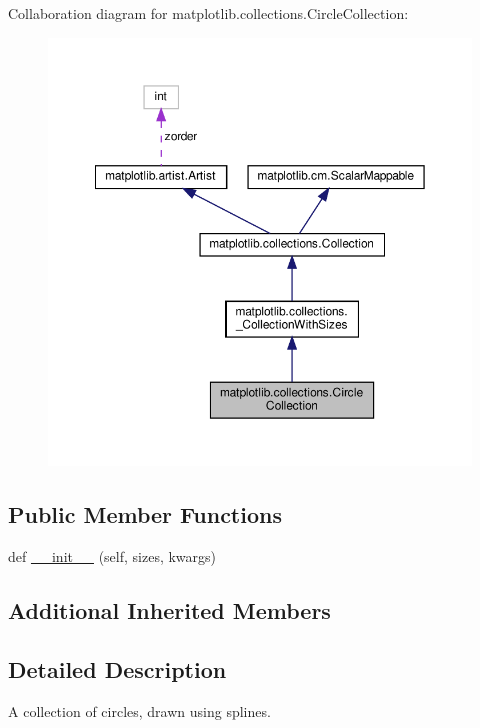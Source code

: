 Collaboration diagram for matplotlib.\+collections.\+Circle\+Collection\+:
\nopagebreak
\begin{figure}[H]
\begin{center}
\leavevmode
\includegraphics[width=350pt]{classmatplotlib_1_1collections_1_1CircleCollection__coll__graph}
\end{center}
\end{figure}
\subsection*{Public Member Functions}
\begin{DoxyCompactItemize}
\item 
def \hyperlink{classmatplotlib_1_1collections_1_1CircleCollection_a992e50dbc51e40835e81f80bc1e263a5}{\+\_\+\+\_\+init\+\_\+\+\_\+} (self, sizes, kwargs)
\end{DoxyCompactItemize}
\subsection*{Additional Inherited Members}


\subsection{Detailed Description}
\begin{DoxyVerb}A collection of circles, drawn using splines.\end{DoxyVerb}
 

